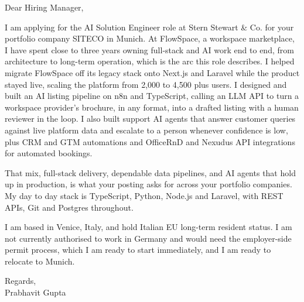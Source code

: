 \documentclass[a4paper,11pt]{article}
\begin{document}
Dear Hiring Manager,

I am applying for the AI Solution Engineer role at Stern Stewart \& Co. for your portfolio company SITECO in Munich. At FlowSpace, a workspace marketplace, I have spent close to three years owning full-stack and AI work end to end, from architecture to long-term operation, which is the arc this role describes. I helped migrate FlowSpace off its legacy stack onto Next.js and Laravel while the product stayed live, scaling the platform from 2,000 to 4,500 plus users. I designed and built an AI listing pipeline on n8n and TypeScript, calling an LLM API to turn a workspace provider's brochure, in any format, into a drafted listing with a human reviewer in the loop. I also built support AI agents that answer customer queries against live platform data and escalate to a person whenever confidence is low, plus CRM and GTM automations and OfficeRnD and Nexudus API integrations for automated bookings.

That mix, full-stack delivery, dependable data pipelines, and AI agents that hold up in production, is what your posting asks for across your portfolio companies. My day to day stack is TypeScript, Python, Node.js and Laravel, with REST APIs, Git and Postgres throughout.

I am based in Venice, Italy, and hold Italian EU long-term resident status. I am not currently authorised to work in Germany and would need the employer-side permit process, which I am ready to start immediately, and I am ready to relocate to Munich.

Regards,\\
Prabhavit Gupta
\end{document}
